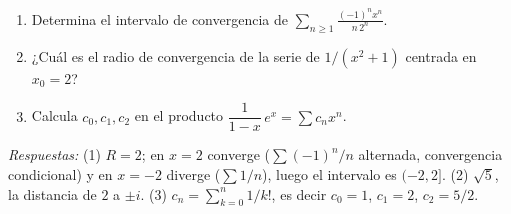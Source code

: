 \begin{exercise}
\begin{enumerate}
\item Determina el intervalo de convergencia de $\displaystyle\sum_{n\ge 1}\frac{(-1)^n x^n}{n\,2^n}$.
\item ¿Cuál es el radio de convergencia de la serie de $1/(x^2+1)$ centrada en $x_0=2$?
\item Calcula $c_0,c_1,c_2$ en el producto $\dfrac{1}{1-x}\,e^{x}=\sum c_n x^n$.
\end{enumerate}
\emph{Respuestas:} (1) $R=2$; en $x=2$ converge ($\sum (-1)^n/n$ alternada, convergencia condicional) y en $x=-2$ diverge ($\sum 1/n$), luego el intervalo es $(-2,2]$. \; (2) $\sqrt5$, la distancia de $2$ a $\pm i$. \; (3) $c_n=\sum_{k=0}^{n}1/k!$, es decir $c_0=1$, $c_1=2$, $c_2=5/2$.
\end{exercise}
